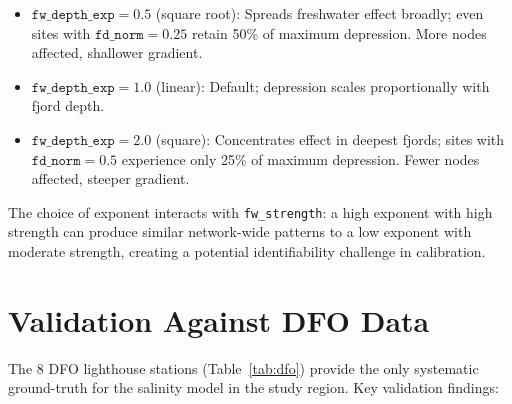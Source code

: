 \documentclass[11pt,a4paper]{article}
\begin{document}
\begin{itemize}
    \item $\texttt{fw\_depth\_exp} = 0.5$ (square root): Spreads freshwater effect broadly; even sites with $\texttt{fd\_norm} = 0.25$ retain 50\% of maximum depression. More nodes affected, shallower gradient.
    \item $\texttt{fw\_depth\_exp} = 1.0$ (linear): Default; depression scales proportionally with fjord depth.
    \item $\texttt{fw\_depth\_exp} = 2.0$ (square): Concentrates effect in deepest fjords; sites with $\texttt{fd\_norm} = 0.5$ experience only 25\% of maximum depression. Fewer nodes affected, steeper gradient.
\end{itemize}

The choice of exponent interacts with \texttt{fw\_strength}: a high exponent with high strength can produce similar network-wide patterns to a low exponent with moderate strength, creating a potential identifiability challenge in calibration.

\section{Validation Against DFO Data}
\label{sec:validation}

The 8 DFO lighthouse stations (Table~\ref{tab:dfo}) provide the only systematic ground-truth for the salinity model in the study region. Key validation findings:
\end{document}
